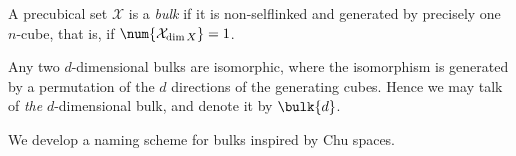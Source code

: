     




    \begin{definition}[Bulk]\label{def:bulk}
        A precubical set $\mathcal{X}$ is a \emph{bulk} if it is non-selflinked and generated by precisely one $n$-cube, that is, if $\num{ \mathcal{X}_{ \dim X}}= 1$.
    \end{definition}

    Any two $d$-dimensional bulks are isomorphic, where the isomorphism is generated by a permutation of the $d$ directions of the generating cubes.  Hence we may talk of \emph{the} $d$-dimensional bulk, and denote it by $\bulk{d}$.

    We develop a naming scheme for bulks inspired by Chu spaces. 


